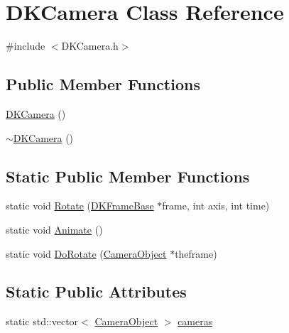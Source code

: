 \hypertarget{class_d_k_camera}{\section{D\-K\-Camera Class Reference}
\label{class_d_k_camera}
}


{\ttfamily \#include $<$D\-K\-Camera.\-h$>$}

\subsection*{Public Member Functions}
\begin{DoxyCompactItemize}
\item 
\hyperlink{class_d_k_camera_a1e9d0fa148d2158ccb873b84bd1e4bb5}{D\-K\-Camera} ()
\item 
\hyperlink{class_d_k_camera_ab0388232cc432d742c2a2e947e31f229}{$\sim$\-D\-K\-Camera} ()
\end{DoxyCompactItemize}
\subsection*{Static Public Member Functions}
\begin{DoxyCompactItemize}
\item 
static void \hyperlink{class_d_k_camera_ab8b019d0509374fdfe0b2ab5d911b576}{Rotate} (\hyperlink{class_d_k_frame_base}{D\-K\-Frame\-Base} $\ast$frame, int axis, int time)
\item 
static void \hyperlink{class_d_k_camera_af96f130387664618a14206fcb8c6c9b2}{Animate} ()
\item 
static void \hyperlink{class_d_k_camera_a3366e55a4f80a44b21a7c7cdb30e638f}{Do\-Rotate} (\hyperlink{struct_camera_object}{Camera\-Object} $\ast$theframe)
\end{DoxyCompactItemize}
\subsection*{Static Public Attributes}
\begin{DoxyCompactItemize}
\item 
static std\-::vector$<$ \hyperlink{struct_camera_object}{Camera\-Object} $>$ \hyperlink{class_d_k_camera_a2f817d697f2ad27e934452a1635fb5d8}{cameras}
\end{DoxyCompactItemize}


